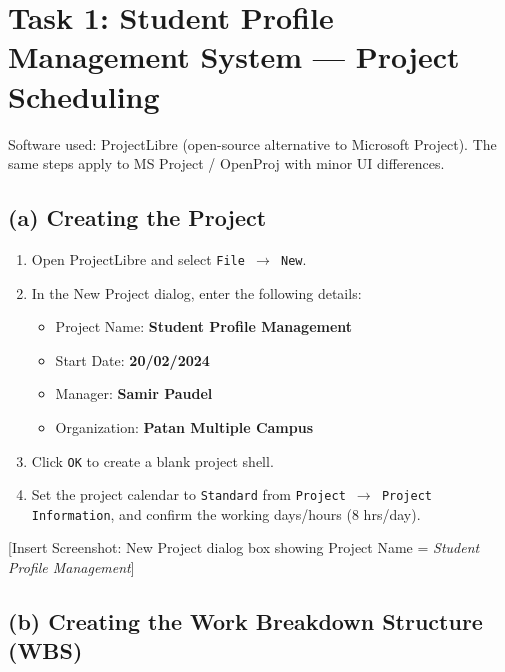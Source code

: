 \documentclass[10pt,a4paper]{article}
\begin{document}
\newpage
\section*{Task 1: Student Profile Management System --- Project Scheduling}

Software used: ProjectLibre (open-source alternative to Microsoft Project). The same steps apply to MS Project / OpenProj with minor UI differences.

\subsection*{(a) Creating the Project}

\begin{enumerate}[nosep]
    \item Open ProjectLibre and select \texttt{File $\to$ New}.
    \item In the New Project dialog, enter the following details:
    \begin{itemize}[nosep]
        \item Project Name: \textbf{Student Profile Management}
        \item Start Date: \textbf{20/02/2024}
        \item Manager: \textbf{Samir Paudel}
        \item Organization: \textbf{Patan Multiple Campus}
    \end{itemize}
    \item Click \texttt{OK} to create a blank project shell.
    \item Set the project calendar to \texttt{Standard} from \texttt{Project $\to$ Project Information}, and confirm the working days/hours (8 hrs/day).
\end{enumerate}

[Insert Screenshot: New Project dialog box showing Project Name = \textit{Student Profile Management}]

\subsection*{(b) Creating the Work Breakdown Structure (WBS)}
\end{document}

